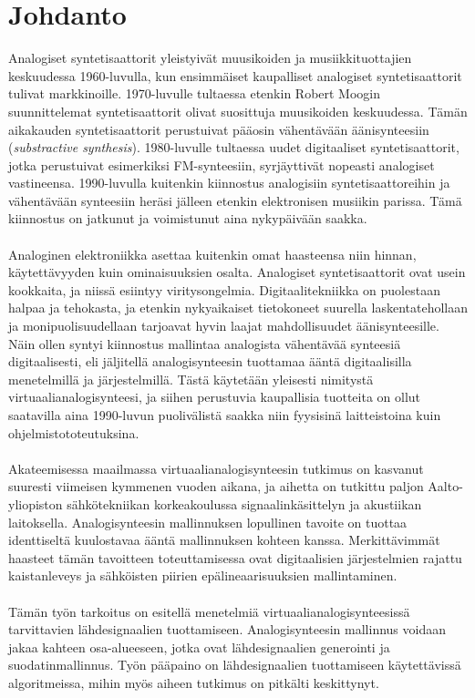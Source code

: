 \documentclass[finnish,12pt,a4paper,pdftex]{article} %
\begin{document}
\cleardoublepage
\storeinipagenumber
{}
\setcounter{page}{1}


\section{Johdanto}

Analogiset syntetisaattorit yleistyivät muusikoiden ja musiikkituottajien keskuudessa 1960-luvulla, kun ensimmäiset kaupalliset analogiset syntetisaattorit tulivat markkinoille. 1970-luvulle tultaessa etenkin Robert Moogin suunnittelemat syntetisaattorit olivat suosittuja muusikoiden keskuudessa. Tämän aikakauden syntetisaattorit perustuivat pääosin vähentävään äänisynteesiin (\textit{substractive synthesis}). 1980-luvulle tultaessa uudet digitaaliset syntetisaattorit, jotka perustuivat esimerkiksi FM-synteesiin, syrjäyttivät nopeasti analogiset vastineensa. 1990-luvulla kuitenkin kiinnostus analogisiin syntetisaattoreihin ja vähentävään synteesiin heräsi jälleen etenkin elektronisen musiikin parissa. Tämä kiinnostus on jatkunut ja voimistunut aina nykypäivään saakka. \cite{Valimaki2007, Pekonen2014} \\\\
Analoginen elektroniikka asettaa kuitenkin omat haasteensa niin hinnan, käytettävyyden kuin ominaisuuksien osalta. Analogiset syntetisaattorit ovat usein kookkaita, ja niissä esiintyy viritysongelmia. Digitaalitekniikka on puolestaan halpaa ja tehokasta, ja etenkin nykyaikaiset tietokoneet suurella laskentatehollaan ja monipuolisuudellaan tarjoavat hyvin laajat mahdollisuudet äänisynteesille. Näin ollen syntyi kiinnostus mallintaa analogista vähentävää synteesiä digitaalisesti, eli jäljitellä analogisynteesin tuottamaa ääntä digitaalisilla menetelmillä ja järjestelmillä. Tästä käytetään yleisesti nimitystä virtuaalianalogisynteesi, ja siihen perustuvia kaupallisia tuotteita on ollut saatavilla aina 1990-luvun puolivälistä saakka niin fyysisinä laitteistoina kuin ohjelmistototeutuksina. \cite{Pekonen2014, Valimaki2006, Nostalgia} \\\\
Akateemisessa maailmassa virtuaalianalogisynteesin tutkimus on kasvanut suuresti viimeisen kymmenen vuoden aikana, ja aihetta on tutkittu paljon Aalto-yliopiston sähkötekniikan korkeakoulussa signaalinkäsittelyn ja akustiikan laitoksella. Analogisynteesin mallinnuksen lopullinen tavoite on tuottaa identtiseltä kuulostavaa ääntä mallinnuksen kohteen kanssa.
Merkittävimmät haasteet tämän tavoitteen toteuttamisessa ovat digitaalisien järjestelmien rajattu kaistanleveys ja sähköisten piirien epälineaarisuuksien mallintaminen. \cite{Historia} \\\\
Tämän työn tarkoitus on esitellä menetelmiä virtuaalianalogisynteesissä tarvittavien lähdesignaalien tuottamiseen. Analogisynteesin mallinnus voidaan jakaa kahteen osa-alueeseen, jotka ovat lähdesignaalien generointi ja suodatinmallinnus. Työn pääpaino on lähdesignaalien tuottamiseen käytettävissä algoritmeissa, mihin myös aiheen tutkimus on pitkälti keskittynyt. \cite{Historia}
\end{document}
